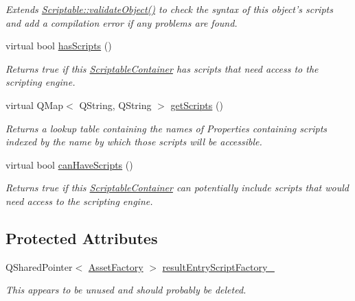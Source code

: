 \begin{DoxyCompactItemize}
\begin{DoxyCompactList}\small\item\em Extends \hyperlink{class_picto_1_1_scriptable_ab6e2944c43a3b5d418bf7b251594386d}{Scriptable\-::validate\-Object()} to check the syntax of this object's scripts and add a compilation error if any problems are found. \end{DoxyCompactList}\item 
virtual bool \hyperlink{class_picto_1_1_result_af0144137305b29bc244e2f5c2fe2e17c}{has\-Scripts} ()
\begin{DoxyCompactList}\small\item\em Returns true if this \hyperlink{class_picto_1_1_scriptable_container}{Scriptable\-Container} has scripts that need access to the scripting engine. \end{DoxyCompactList}\item 
virtual Q\-Map$<$ Q\-String, Q\-String $>$ \hyperlink{class_picto_1_1_result_a47fc28fbcf0000dda57b5a959977e9f9}{get\-Scripts} ()
\begin{DoxyCompactList}\small\item\em Returns a lookup table containing the names of Properties containing scripts indexed by the name by which those scripts will be accessible. \end{DoxyCompactList}\item 
\hypertarget{class_picto_1_1_result_a02d6b44ae59830de082b750882cb7c46}{virtual bool \hyperlink{class_picto_1_1_result_a02d6b44ae59830de082b750882cb7c46}{can\-Have\-Scripts} ()}\label{class_picto_1_1_result_a02d6b44ae59830de082b750882cb7c46}

\begin{DoxyCompactList}\small\item\em Returns true if this \hyperlink{class_picto_1_1_scriptable_container}{Scriptable\-Container} can potentially include scripts that would need access to the scripting engine. \end{DoxyCompactList}\end{DoxyCompactItemize}
\subsection*{Protected Attributes}
\begin{DoxyCompactItemize}
\item 
\hypertarget{class_picto_1_1_result_a362ebd040e65af7b8e8eb57bba13ee2c}{Q\-Shared\-Pointer$<$ \hyperlink{class_picto_1_1_asset_factory}{Asset\-Factory} $>$ \hyperlink{class_picto_1_1_result_a362ebd040e65af7b8e8eb57bba13ee2c}{result\-Entry\-Script\-Factory\-\_\-}}\label{class_picto_1_1_result_a362ebd040e65af7b8e8eb57bba13ee2c}

\begin{DoxyCompactList}\small\item\em This appears to be unused and should probably be deleted. \end{DoxyCompactList}\end{DoxyCompactItemize}
